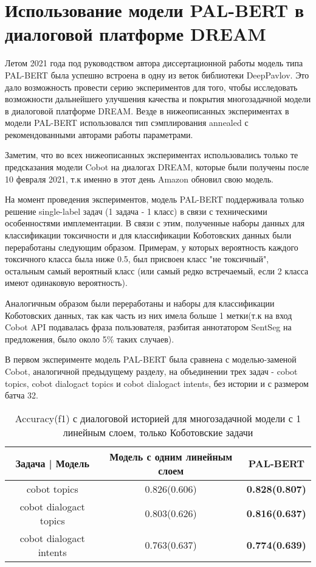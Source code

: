 \section{Использование модели PAL-BERT в диалоговой платформе DREAM} 

Летом 2021 года под руководством автора диссертационной работы модель типа PAL-BERT \cite{stickland_2019} была успешно встроена в одну из веток библиотеки DeepPavlov. Это дало возможность провести серию экспериментов для того, чтобы исследовать возможности дальнейшего улучшения качества и покрытия многозадачной модели в диалоговой платформе DREAM. Везде в нижеописанных экспериментах в модели PAL-BERT использовался  тип сэмплирования annealed с рекомендованными авторами работы \cite{stickland_2019} параметрами.

Заметим, что во всех нижеописанных экспериментах использовались только те предсказания модели Cobot на диалогах DREAM, которые были получены после 10 февраля 2021, т.к именно в этот день Amazon обновил свою модель.

На момент проведения экспериментов, модель PAL-BERT поддерживала только решение single-label задач (1 задача - 1 класс) в связи с техническими особенностями имплементации. В связи с этим, полученные наборы данных для классификации токсичности и для классификации Коботовских данных были переработаны следующим образом. Примерам, у которых вероятность каждого токсичного класса была ниже 0.5, был присвоен класс "не токсичный", остальным самый вероятный класс (или самый редко встречаемый, если 2 класса имеют одинаковую вероятность).

Аналогичным образом были переработаны и наборы для классификации Коботовских данных, так как часть из них имела больше 1 метки(т.к на вход Cobot API  подавалась фраза пользователя, разбитая аннотатором SentSeg на предложения, было около 5\% таких случаев). 

В первом эксперименте модель PAL-BERT была сравнена с моделью-заменой Cobot, аналогичной предыдущему разделу, на объединении трех задач - cobot topics, cobot dialogact topics и cobot dialogact intents, без истории и с размером батча 32.

\begin{table}[htbp]
\centering
\caption {Accuracy(f1) с диалоговой историей для многозадачной модели с 1 линейным слоем, только Коботовские задачи}
\label{mtldream:3}
\begin{tabular}{|c||c|c|} \hline
Задача | Модель & Модель с одним линейным слоем & PAL-BERT \\
\hline
\hline
cobot topics & 0.826(0.606) & \textbf{0.828(0.807)} \\
\hline
cobot dialogact topics & 0.803(0.626) & \textbf{0.816(0.637)} \\
\hline
cobot dialogact intents & 0.763(0.637) & \textbf{0.774(0.639)} \\  
\hline
\end{tabular}
\end{table}

